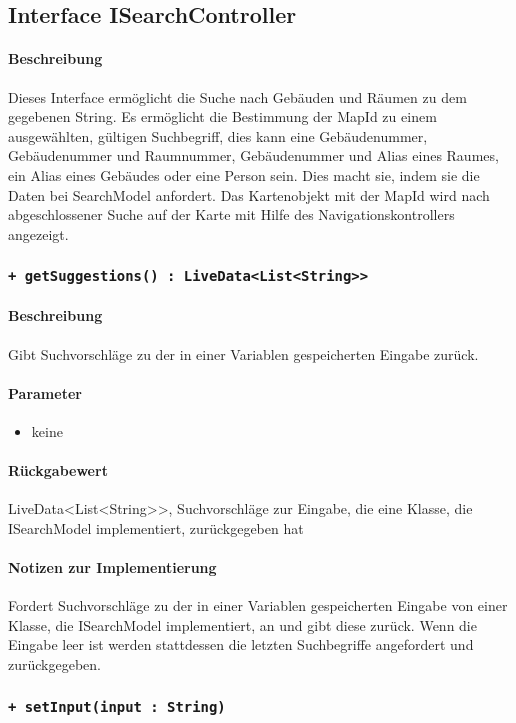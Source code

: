 \subsection{Interface ISearchController}
\paragraph*{Beschreibung}
Dieses Interface ermöglicht die Suche nach Gebäuden und Räumen zu dem gegebenen String. 
Es ermöglicht die Bestimmung der MapId zu einem ausgewählten, gültigen Suchbegriff, 
dies kann eine Gebäudenummer, Gebäudenummer und Raumnummer, Gebäudenummer und Alias eines Raumes, ein Alias eines Gebäudes oder eine Person sein.
Dies macht sie, indem sie die Daten bei SearchModel anfordert.
Das Kartenobjekt mit der MapId wird nach abgeschlossener Suche auf der Karte mit Hilfe des Navigationskontrollers angezeigt.


\subsubsection{\texttt{+ getSuggestions() : LiveData<List<String>>}}%
\paragraph*{Beschreibung}
Gibt Suchvorschläge zu der in einer Variablen gespeicherten Eingabe zurück.
\paragraph*{Parameter}
\begin{itemize}
    \item keine
\end{itemize}
\paragraph*{Rückgabewert}
LiveData<List<String>>, Suchvorschläge zur Eingabe, die eine Klasse, die ISearchModel implementiert, zurückgegeben hat
\paragraph*{Notizen zur Implementierung}
Fordert Suchvorschläge zu der in einer Variablen gespeicherten Eingabe von einer Klasse, die ISearchModel implementiert, an und gibt diese zurück.
Wenn die Eingabe leer ist werden stattdessen die letzten Suchbegriffe angefordert und zurückgegeben.

\subsubsection{\texttt{+ setInput(input : String)}}%
